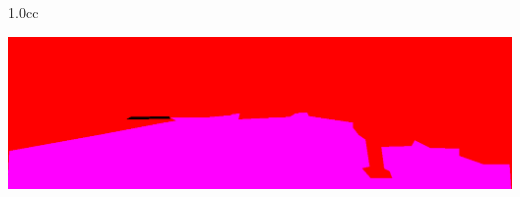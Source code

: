 \begin{table}
\begin{tabular*}{1.0\linewidth}{{c}{c}}
\begin{minipage}{.3\textwidth}
      \includegraphics[scale=.125]{figures/export/umm_road_000025.png} 
    \end{minipage}\\\\
  \end{tabular*}
   
  \label{table:image_segmentation}
\end{table}
